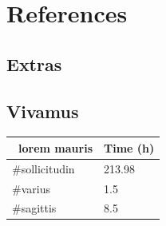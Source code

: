 \documentclass[paper=a4,dissertation,math,vertlayout,pdfa,colorlinks,nologo]{aaltoseries}
\begin{document}
\chapter{References}
{
    \let\clearpage\relax
    \renewcommand{\bibsection}{\section*{\bibname}}
    \renewcommand{\bibname}{Bibliography}
    \LARGE
}
\begin{appendices}
\chapter{Extras}
\section*{Vivamus }
    \begin{table}[!htb]
        \begin{tabular}{|l|l|}
        \hline
        \ lorem mauris      & Time (h) \\ \hline
        \#sollicitudin      & 213.98 \\ \hline
        \#varius            & 1.5    \\ \hline
        \#sagittis          & 8.5    \\ \hline
        \end{tabular}
    \end{table}
\end{appendices}
\end{document}
